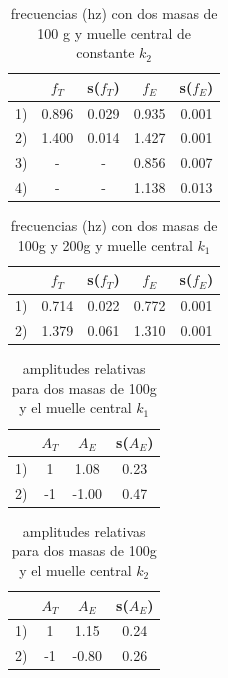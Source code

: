 \documentclass[12pt,a4paper]{article}
\begin{document}
\begin{table}[h!] \centering 
\begin{tabular}{|c|c|c|c|c|}  
\hline
 	 & $f_T$ 	 & s($f_T$) 	 & $f_E$ 	 & s($f_E$) \\ \hline
1) 	 & 0.896 	 & 0.029   	 & 0.935   	 & 0.001 \\ 
 2) 	 & 1.400 	 & 0.014 	 & 1.427   	 & 0.001 \\ 
 3) 	 &   -  	 &    -  	 & 0.856   	 & 0.007 \\ 
4) 	 &   -  	 &    -  	 & 1.138   	 & 0.013 \\ 
\hline
\end{tabular} 
\caption{frecuencias (hz) con dos masas de 100 g y muelle central de constante $k_2$}
\label{} 
\end{table}



\begin{table}[h!] \centering 
\begin{tabular}{|c|c|c|c|c|}  
\hline 
 	 & $f_T$ 	 & s($f_T$) 	 & $f_E$ 	 & s($f_E$) \\ \hline
1) 	 & 0.714 	 & 0.022  	 & 0.772   	 & 0.001 \\ 
2) 	 & 1.379	     & 0.061  	 & 1.310   	 & 0.001 \\ 
\hline 
\end{tabular} 
\caption{frecuencias (hz) con dos masas de 100g y 200g y  muelle central $k_1$}
\label{} 
\end{table}


\begin{table}[h!] \centering 
\begin{tabular}{|c|c|c|c|}  
\hline
 	 & $A_T$  	 & $A_E$ 	 & s($A_E$) \\ \hline 
1) 	 & 1   	 & 1.08      & 0.23 \\ 
 2) 	 & -1   	 & -1.00   	 & 0.47 \\ 
 \hline 
\end{tabular} 
\caption{amplitudes relativas para dos masas de 100g y el muelle central $k_1$}
\label{} 
\end{table}

\begin{table}[h!] \centering 
\begin{tabular}{|c|c|c|c|}  
\hline
 	 & $A_T$  	 & $A_E$ 	 & s($A_E$) \\ \hline 
1) 	 & 1   	 & 1.15   	 & 0.24 \\ 
 2) 	 & -1   	 & -0.80   	 & 0.26 \\ 
 \hline 
\end{tabular} 
\caption{amplitudes relativas para dos masas de 100g y el muelle central $k_2$}
\label{} 
\end{table}
\end{document}
